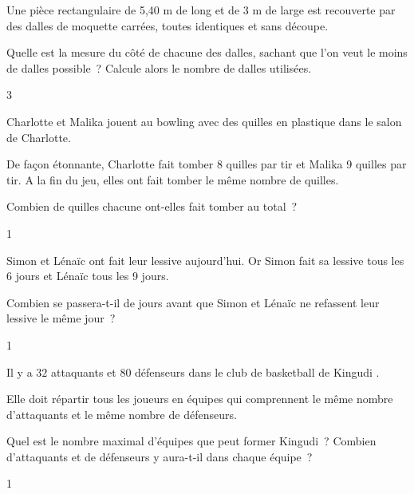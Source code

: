 \documentclass[a4paper,11pt]{report}
\begin{document}
\begin{exo}{  %
    Une pièce rectangulaire de 5,40 m de long et de 3 m de large est recouverte  par des dalles de moquette carrées, toutes identiques et sans découpe.
    \begin{tasks}[label-width = 1em ,item-indent = 2em ,before-skip = -0.4em, after-skip = -0.4em , label-offset=0.666em,after-item-skip = 0.3em]
        \task Quelle est la mesure du côté de chacune des dalles, sachant que l'on veut le moins de dalles possible~?
        \task Calcule alors le nombre de dalles utilisées.
    \end{tasks}
}{3}\end{exo}


\begin{exo}{ %
    Charlotte et Malika jouent au bowling avec des quilles en plastique dans le salon de Charlotte. 

    De façon étonnante, Charlotte fait tomber 8 quilles par tir et Malika 9 quilles par tir. A la fin du jeu, elles ont fait tomber le même nombre de quilles.

    Combien de quilles chacune ont-elles fait tomber au total~? 
}{1}\end{exo}


\begin{exo}{ %
    Simon et Lénaïc ont fait leur lessive aujourd'hui. Or Simon fait sa lessive tous les 6 jours et Lénaïc tous les 9 jours. 

    Combien se passera-t-il de jours avant que Simon et Lénaïc ne refassent leur lessive le même jour~? 
}{1}\end{exo}




\begin{exo}{ %
    Il y a $32$ attaquants et $80$ défenseurs dans le club de basketball de Kingudi . 

     Elle doit répartir tous les joueurs en équipes qui comprennent le même nombre d'attaquants et le même nombre de défenseurs. 
    \begin{tasks}[label-width = 1em ,item-indent = 2em ,before-skip = -0.4em, after-skip = -0.4em , label-offset=0.666em,after-item-skip = 0.3em]
        \task Quel est le nombre maximal d'équipes que peut former Kingudi~?
        \task Combien d'attaquants et de défenseurs y aura-t-il dans chaque équipe~?
    \end{tasks}
}{1}\end{exo}
\end{document}
